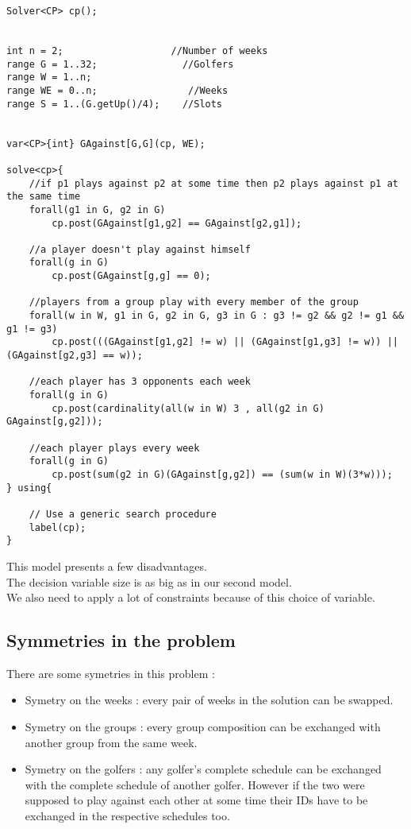 \documentclass{eplDoc}
\begin{document}
\begin{lstlisting}
Solver<CP> cp();


int n = 2;                   //Number of weeks
range G = 1..32;               //Golfers
range W = 1..n;
range WE = 0..n;                //Weeks
range S = 1..(G.getUp()/4);    //Slots


var<CP>{int} GAgainst[G,G](cp, WE);   

solve<cp>{
    //if p1 plays against p2 at some time then p2 plays against p1 at the same time
    forall(g1 in G, g2 in G)
        cp.post(GAgainst[g1,g2] == GAgainst[g2,g1]);

    //a player doesn't play against himself
    forall(g in G)
        cp.post(GAgainst[g,g] == 0);
    
    //players from a group play with every member of the group
    forall(w in W, g1 in G, g2 in G, g3 in G : g3 != g2 && g2 != g1 && g1 != g3)
        cp.post(((GAgainst[g1,g2] != w) || (GAgainst[g1,g3] != w)) || (GAgainst[g2,g3] == w));
    
    //each player has 3 opponents each week 
    forall(g in G)
        cp.post(cardinality(all(w in W) 3 , all(g2 in G) GAgainst[g,g2]));

    //each player plays every week
    forall(g in G)
        cp.post(sum(g2 in G)(GAgainst[g,g2]) == (sum(w in W)(3*w)));
} using{

    // Use a generic search procedure
    label(cp);
}
\end{lstlisting}

This model presents a few disadvantages. \\ 
The decision variable size is as big as in our second model. \\ 
We also need to apply a lot of constraints because of this choice of variable. 

\subsection{Symmetries in the problem}

There are some symetries in this problem : 
\begin{itemize}
	\item Symetry on the weeks : every pair of weeks in the solution can be swapped. 
	\item Symetry on the groups : every group composition can be exchanged with another group from the same week. 
	\item Symetry on the golfers : any golfer's complete schedule can be exchanged with the complete schedule of another golfer. However if the two were supposed to play against each other at some time their IDs have to be exchanged in the respective schedules too.
\end{itemize}
\end{document}
